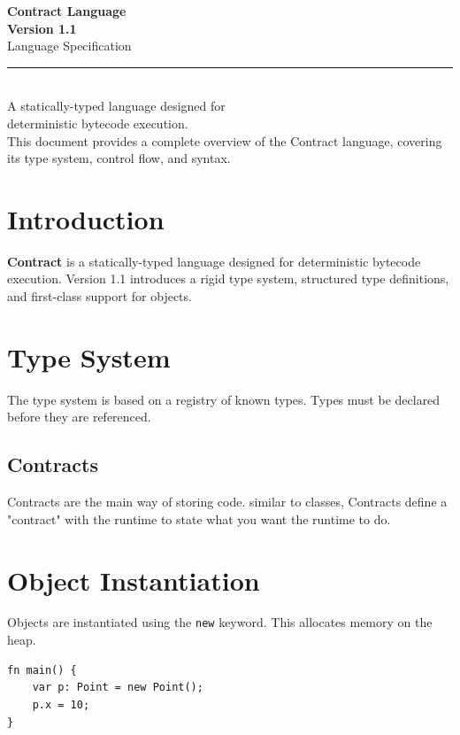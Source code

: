 \documentclass[11pt,a4paper]{article}
\newcommand{\code}[1]{\texttt{\small #1}}
\begin{document}
\begin{titlepage}
  \centering
  \vspace*{3cm}
  {\Huge\bfseries Contract Language}\\[0.5em]
  {\large\bfseries Version 1.1}\\[0.8em]
  {\Large Language Specification}\\[2.5em]
  \rule{0.55\linewidth}{0.4pt}\\[1.2em]
  {\normalsize
    A statically-typed language designed for\\[0.3em]
    deterministic bytecode execution.
  }\\[2.5em]
  \vfill
  {\small This document provides a complete overview of the Contract language,
  covering its type system, control flow, and syntax.}
\end{titlepage}

\tableofcontents
\newpage

\section{Introduction}
\textbf{Contract} is a statically-typed language designed for deterministic
bytecode execution. Version 1.1 introduces a rigid type system, structured
type definitions, and first-class support for objects.

\section{Type System}
The type system is based on a registry of known types. Types must be declared
before they are referenced.

\subsection{Contracts}
Contracts are the main way of storing code.
similar to classes, Contracts define a "contract" with the runtime to state what you want the runtime to do.



\section{Object Instantiation}
Objects are instantiated using the \code{new} keyword. This allocates memory on the heap.

\begin{lstlisting}[style=contract, caption=Instantiation and usage]
fn main() {
    var p: Point = new Point();
    p.x = 10;
}
\end{lstlisting}
\end{document}
